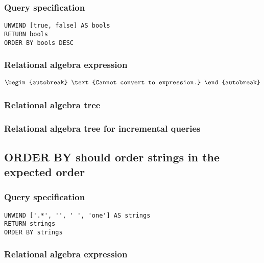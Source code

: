 \subsubsection*{Query specification}

\begin{lstlisting}
UNWIND [true, false] AS bools
RETURN bools
ORDER BY bools DESC
\end{lstlisting}

\subsubsection*{Relational algebra expression}

\begin{align*}
\begin{autobreak}
\text{Cannot convert to expression.}
\end{autobreak}
\end{align*}

\subsubsection*{Relational algebra tree}


\subsubsection*{Relational algebra tree for incremental queries}


\subsection{ORDER BY should order strings in the expected order}

\subsubsection*{Query specification}

\begin{lstlisting}
UNWIND ['.*', '', ' ', 'one'] AS strings
RETURN strings
ORDER BY strings
\end{lstlisting}

\subsubsection*{Relational algebra expression}

